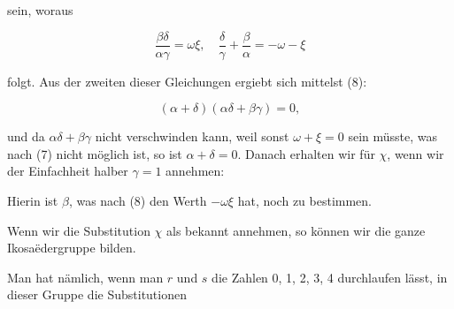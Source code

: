 sein, woraus

\[
\frac{\beta\delta}{\alpha\gamma} = \omega\xi, \quad \frac{\delta}{\gamma} + \frac{\beta}{\alpha} = -\omega - \xi
\]

folgt. Aus der zweiten dieser Gleichungen ergiebt sich mittelst (8):

\[
(\alpha + \delta)(\alpha\delta + \beta\gamma) = 0,
\]

und da $\alpha\delta + \beta\gamma$ nicht verschwinden kann, weil sonst $\omega + \xi = 0$
sein m\"usste, was nach (7) nicht m\"oglich ist, so ist $\alpha + \delta = 0$.
Danach erhalten wir f\"ur $\chi$, wenn wir der Einfachheit halber
$\gamma = 1$ annehmen:


Hierin ist $\beta$, was nach (8) den Werth $-\omega\xi$ hat, noch zu
bestimmen.

Wenn wir die Substitution $\chi$ als bekannt annehmen, so
k\"onnen wir die ganze Ikosa\"edergruppe bilden.

Man hat n\"amlich, wenn man $r$ und $s$ die Zahlen 0, 1, 2, 3, 4
durchlaufen l\"asst, in dieser Gruppe die Substitutionen

